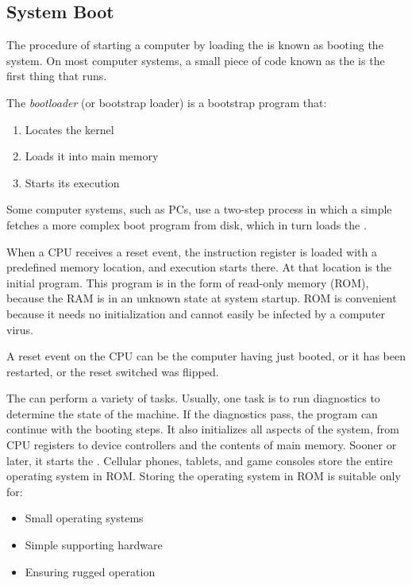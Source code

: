 \subsection{System Boot}\label{subsec:System_Boot}
The procedure of starting a computer by loading the  is known as booting the system.
On most computer systems, a small piece of code known as the  is the first thing that runs.

\begin{definition}[Bootloader]\label{def:Bootloader}
  The \emph{bootloader} (or bootstrap loader) is a bootstrap program that:
  \begin{enumerate}[noitemsep]
  \item Locates the kernel
  \item Loads it into main memory
  \item Starts its execution
  \end{enumerate}
\end{definition}

Some computer systems, such as PCs, use a two-step process in which a simple  fetches a more complex boot program from disk, which in turn loads the .

When a CPU receives a reset event, the instruction register is loaded with a predefined memory location, and execution starts there.
At that location is the initial  program.
This program is in the form of read-only memory (ROM), because the RAM is in an unknown state at system startup.
ROM is convenient because it needs no initialization and cannot easily be infected by a computer virus.

\begin{remark*}
  A reset event on the CPU can be the computer having just booted, or it has been restarted, or the reset switched was flipped.
\end{remark*}

The  can perform a variety of tasks.
Usually, one task is to run diagnostics to determine the state of the machine.
If the diagnostics pass, the program can continue with the booting steps.
It also initializes all aspects of the system, from CPU registers to device controllers and the contents of main memory.
Sooner or later, it starts the .
Cellular phones, tablets, and game consoles store the entire operating system in ROM.\@
Storing the operating system in ROM is suitable only for:
\begin{itemize}[noitemsep]
\item Small operating systems
\item Simple supporting hardware
\item Ensuring rugged operation
\end{itemize}

